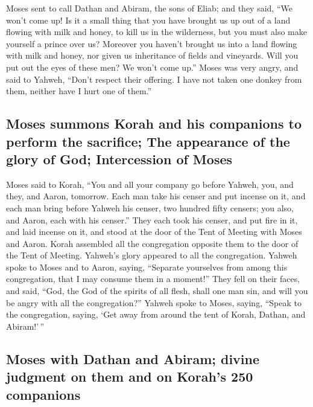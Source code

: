  Moses sent to call Dathan and Abiram, the sons of Eliab;
and they said, ``We won't come up!  Is it a small thing
that you have brought us up out of a land flowing with milk and honey,
to kill us in the wilderness, but you must also make yourself a prince
over us?  Moreover you haven't brought us into a land
flowing with milk and honey, nor given us inheritance of fields and
vineyards. Will you put out the eyes of these men? We won't come up.''
 Moses was very angry, and said to Yahweh, ``Don't
respect their offering. I have not taken one donkey from them, neither
have I hurt one of them.''

\hypertarget{moses-summons-korah-and-his-companions-to-perform-the-sacrifice-the-appearance-of-the-glory-of-god-intercession-of-moses}{%
\subsection{Moses summons Korah and his companions to perform the
sacrifice; The appearance of the glory of God; Intercession of
Moses}\label{moses-summons-korah-and-his-companions-to-perform-the-sacrifice-the-appearance-of-the-glory-of-god-intercession-of-moses}}

 Moses said to Korah, ``You and all your company go
before Yahweh, you, and they, and Aaron, tomorrow.  Each
man take his censer and put incense on it, and each man bring before
Yahweh his censer, two hundred fifty censers; you also, and Aaron, each
with his censer.''  They each took his censer, and put
fire in it, and laid incense on it, and stood at the door of the Tent of
Meeting with Moses and Aaron.  Korah assembled all the
congregation opposite them to the door of the Tent of Meeting. Yahweh's
glory appeared to all the congregation.  Yahweh spoke to
Moses and to Aaron, saying,  ``Separate yourselves from
among this congregation, that I may consume them in a moment!''
 They fell on their faces, and said, ``God, the God of
the spirits of all flesh, shall one man sin, and will you be angry with
all the congregation?''  Yahweh spoke to Moses, saying,
 ``Speak to the congregation, saying, `Get away from
around the tent of Korah, Dathan, and Abiram!'\,''

\hypertarget{moses-with-dathan-and-abiram-divine-judgment-on-them-and-on-korahs-250-companions}{%
\subsection{Moses with Dathan and Abiram; divine judgment on them and on
Korah's 250
companions}\label{moses-with-dathan-and-abiram-divine-judgment-on-them-and-on-korahs-250-companions}}

